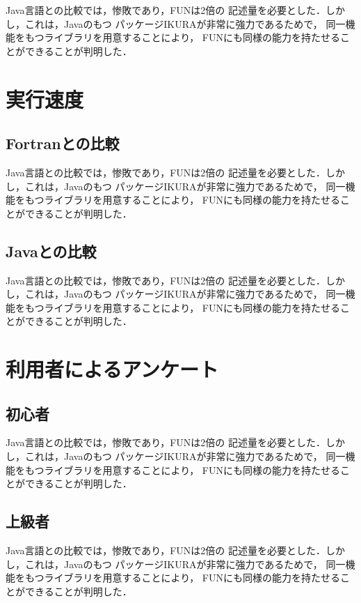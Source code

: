\documentclass{funthesis}
\begin{document}
Java言語との比較では，惨敗であり，FUNは2倍の
記述量を必要とした．しかし，これは，Javaのもつ
パッケージIKURAが非常に強力であるためで，
同一機能をもつライブラリを用意することにより，
FUNにも同様の能力を持たせることができることが判明した．

\section{実行速度}

\subsection{Fortranとの比較}

Java言語との比較では，惨敗であり，FUNは2倍の
記述量を必要とした．しかし，これは，Javaのもつ
パッケージIKURAが非常に強力であるためで，
同一機能をもつライブラリを用意することにより，
FUNにも同様の能力を持たせることができることが判明した．

\subsection{Javaとの比較}

Java言語との比較では，惨敗であり，FUNは2倍の
記述量を必要とした．しかし，これは，Javaのもつ
パッケージIKURAが非常に強力であるためで，
同一機能をもつライブラリを用意することにより，
FUNにも同様の能力を持たせることができることが判明した．

\section{利用者によるアンケート}

\subsection{初心者}

Java言語との比較では，惨敗であり，FUNは2倍の
記述量を必要とした．しかし，これは，Javaのもつ
パッケージIKURAが非常に強力であるためで，
同一機能をもつライブラリを用意することにより，
FUNにも同様の能力を持たせることができることが判明した．

\subsection{上級者}

Java言語との比較では，惨敗であり，FUNは2倍の
記述量を必要とした．しかし，これは，Javaのもつ
パッケージIKURAが非常に強力であるためで，
同一機能をもつライブラリを用意することにより，
FUNにも同様の能力を持たせることができることが判明した．
\end{document}
